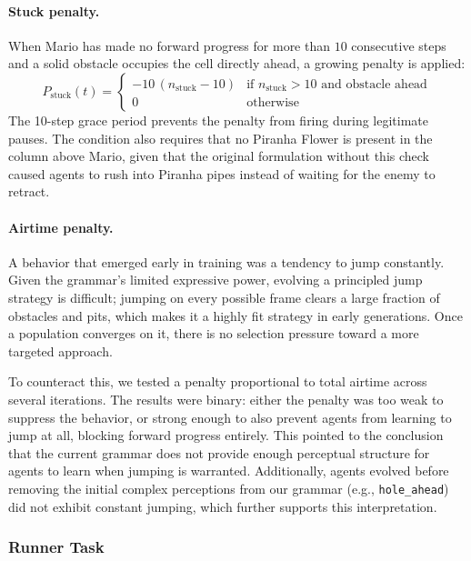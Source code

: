 \documentclass[runningheads]{llncs}
\begin{document}
\paragraph{Stuck penalty.}
When Mario has made no forward progress for more than $10$ consecutive steps and a solid obstacle occupies the cell directly ahead, a growing penalty is applied:
\begin{equation}
P_{\text{stuck}}(t) = \begin{cases}
    -10\,(n_{\text{stuck}} - 10) & \text{if } n_{\text{stuck}} > 10 \text{ and obstacle ahead} \\
    0 & \text{otherwise}
\end{cases}
\end{equation}
The 10-step grace period prevents the penalty from firing during legitimate pauses. The condition also requires that no Piranha Flower is present in the column above Mario, given that the original formulation without this check caused agents to rush into Piranha pipes instead of waiting for the enemy to retract.

\paragraph{Airtime penalty.}
A behavior that emerged early in training was a tendency to jump constantly. Given the grammar's limited expressive power, evolving a principled jump strategy is difficult; jumping on every possible frame clears a large fraction of obstacles and pits, which makes it a highly fit strategy in early generations. Once a population converges on it, there is no selection pressure toward a more targeted approach.

To counteract this, we tested a penalty proportional to total airtime across several iterations. The results were binary: either the penalty was too weak to suppress the behavior, or strong enough to also prevent agents from learning to jump at all, blocking forward progress entirely. This pointed to the conclusion that the current grammar does not provide enough perceptual structure for agents to learn when jumping is warranted. Additionally, agents evolved before removing the initial complex perceptions from our grammar (e.g., \texttt{hole\_ahead}) did not exhibit constant jumping, which further supports this interpretation.

\subsubsection{Runner Task}
\end{document}
